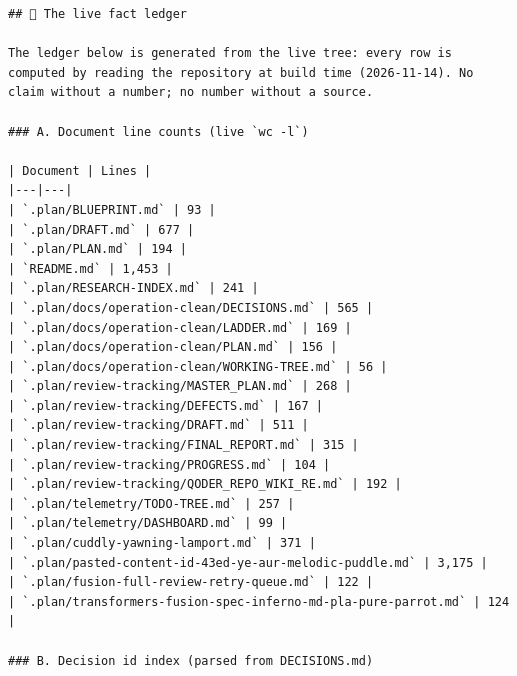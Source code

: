 \begin{Verbatim}[breaklines,breakanywhere,fontsize=\footnotesize]
## 📒 The live fact ledger

The ledger below is generated from the live tree: every row is computed by reading the repository at build time (2026-11-14). No claim without a number; no number without a source.

### A. Document line counts (live `wc -l`)

| Document | Lines |
|---|---|
| `.plan/BLUEPRINT.md` | 93 |
| `.plan/DRAFT.md` | 677 |
| `.plan/PLAN.md` | 194 |
| `README.md` | 1,453 |
| `.plan/RESEARCH-INDEX.md` | 241 |
| `.plan/docs/operation-clean/DECISIONS.md` | 565 |
| `.plan/docs/operation-clean/LADDER.md` | 169 |
| `.plan/docs/operation-clean/PLAN.md` | 156 |
| `.plan/docs/operation-clean/WORKING-TREE.md` | 56 |
| `.plan/review-tracking/MASTER_PLAN.md` | 268 |
| `.plan/review-tracking/DEFECTS.md` | 167 |
| `.plan/review-tracking/DRAFT.md` | 511 |
| `.plan/review-tracking/FINAL_REPORT.md` | 315 |
| `.plan/review-tracking/PROGRESS.md` | 104 |
| `.plan/review-tracking/QODER_REPO_WIKI_RE.md` | 192 |
| `.plan/telemetry/TODO-TREE.md` | 257 |
| `.plan/telemetry/DASHBOARD.md` | 99 |
| `.plan/cuddly-yawning-lamport.md` | 371 |
| `.plan/pasted-content-id-43ed-ye-aur-melodic-puddle.md` | 3,175 |
| `.plan/fusion-full-review-retry-queue.md` | 122 |
| `.plan/transformers-fusion-spec-inferno-md-pla-pure-parrot.md` | 124 |

### B. Decision id index (parsed from DECISIONS.md)


\end{Verbatim}
